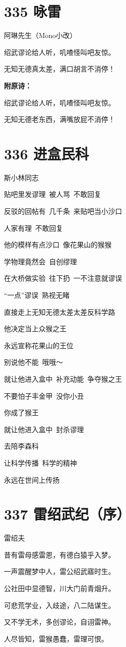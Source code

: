 \documentclass[UTF8,12pt,oneside]{ctexbook}
\def\pau#1{\begin{center} {#1} \end{center}} %
\def\poem#1#2{\section{#1}\pau{#2}} %
\begin{document}
        \poem{335 咏雷}{阿琳先生（Mono小改）}
        \begin{center}
            绍武谬论给人听，叽喳怪叫吧友惊。
            
            无知无德真太差，满口胡言不消停！
        \end{center}
            
        \noindent \textbf{附原诗：}
        \begin{center}
            绍武谬论给人听，叽喳怪叫吧友惊。
            
            无知无德老东西，满嘴放屁不消停！
        \end{center} 
        
        \poem{336 进盒民科}{斯小林同志}
        \begin{center}
            贴吧里发谬理\ 被人骂\ 不敢回复
            
            反驳的回帖有\ 几千条\ 来贴吧当小沙口
            
            人家有理\ 不敢回复
            
            他的模样有点沙口\ 像花果山的猴猴
            
            学物理竟然会\ 自创缪理
            
            在大桥做实验\ 往下扔\ 一不注意就谬误
            
            “一点”谬误\ 熟视无睹
            
            直接走上无知无德太差太差反科学路
            
            他决定当上众猴之王
            
            永远宣称花果山的王位
            
            别说他不能\ 哦哦～
            
            就让他进入盒中\ 补充动能\ 争夺猴之王
            
            不要怕子丰金甲\ 没你小丑
            
            你成了猴王
            
            就让他进入盒中\ 封杀谬理
            
            去陪李森科
            
            让科学传播\ 科学的精神
            
            永远在世间上传扬
        \end{center}

        \poem{337 雷绍武纪（序）}{雷绍夫}
        \begin{center}
            昔有雷母感雷恩，有德白猿乎入梦。
            
            一声震醒梦中人，雷公绍武寤时生。
            
            公社田中显德智，川大门前青烟升。
            
            可悲荒学业，入歧途，八二陆谋生。
            
            又不学无术，多创谬论，自诩雷神。
            
            人尽皆知，雷猴愚蠢，雷理可恨。
        \end{center}
\end{document}
